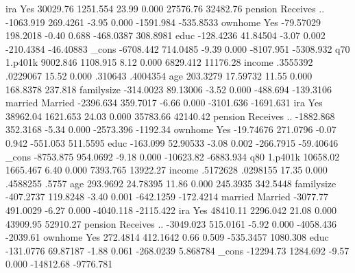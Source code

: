              {\VBAR}
         ira {\VBAR}
        Yes  {\VBAR}   30029.76   1251.554    23.99   0.000     27576.76    32482.76
             {\VBAR}
     pension {\VBAR}
Receives ..  {\VBAR}  -1063.919   269.4261    -3.95   0.000    -1591.984   -535.8533
             {\VBAR}
     ownhome {\VBAR}
        Yes  {\VBAR}  -79.57029   198.2018    -0.40   0.688    -468.0387    308.8981
        educ {\VBAR}  -128.4236   41.84504    -3.07   0.002    -210.4384   -46.40883
       _cons {\VBAR}  -6708.442   714.0485    -9.39   0.000    -8107.951   -5308.932
q70          {\VBAR}
     1.p401k {\VBAR}   9002.846   1108.915     8.12   0.000     6829.412    11176.28
      income {\VBAR}   .3555392   .0229067    15.52   0.000      .310643    .4004354
         age {\VBAR}   203.3279   17.59732    11.55   0.000     168.8378     237.818
  familysize {\VBAR}  -314.0023   89.13006    -3.52   0.000     -488.694   -139.3106
             {\VBAR}
     married {\VBAR}
    Married  {\VBAR}  -2396.634   359.7017    -6.66   0.000    -3101.636   -1691.631
             {\VBAR}
         ira {\VBAR}
        Yes  {\VBAR}   38962.04   1621.653    24.03   0.000     35783.66    42140.42
             {\VBAR}
     pension {\VBAR}
Receives ..  {\VBAR}  -1882.868   352.3168    -5.34   0.000    -2573.396    -1192.34
             {\VBAR}
     ownhome {\VBAR}
        Yes  {\VBAR}  -19.74676   271.0796    -0.07   0.942     -551.053    511.5595
        educ {\VBAR}   -163.099   52.90533    -3.08   0.002    -266.7915   -59.40646
       _cons {\VBAR}  -8753.875   954.0692    -9.18   0.000    -10623.82   -6883.934
q80          {\VBAR}
     1.p401k {\VBAR}   10658.02   1665.467     6.40   0.000     7393.765    13922.27
      income {\VBAR}   .5172628   .0298155    17.35   0.000     .4588255       .5757
         age {\VBAR}   293.9692   24.78395    11.86   0.000     245.3935    342.5448
  familysize {\VBAR}  -407.2737   119.8248    -3.40   0.001    -642.1259   -172.4214
             {\VBAR}
     married {\VBAR}
    Married  {\VBAR}   -3077.77   491.0029    -6.27   0.000    -4040.118   -2115.422
             {\VBAR}
         ira {\VBAR}
        Yes  {\VBAR}   48410.11   2296.042    21.08   0.000     43909.95    52910.27
             {\VBAR}
     pension {\VBAR}
Receives ..  {\VBAR}  -3049.023   515.0161    -5.92   0.000    -4058.436    -2039.61
             {\VBAR}
     ownhome {\VBAR}
        Yes  {\VBAR}   272.4814   412.1642     0.66   0.509    -535.3457    1080.308
        educ {\VBAR}  -131.0776   69.87187    -1.88   0.061    -268.0239    5.868784
       _cons {\VBAR}  -12294.73   1284.692    -9.57   0.000    -14812.68   -9776.781
